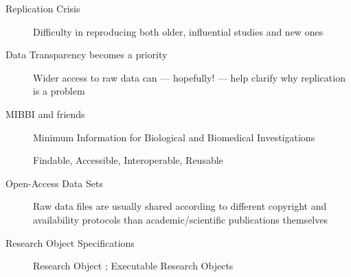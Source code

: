 \begin{frame}{}
\hspace{50pt}\begin{minipage}{.795\textwidth}
{\LARGE {}\selectfont \setlength{\leftmargini}{3pt}\begin{description}
\item[Replication Crisis] {} Difficulty in reproducing both older, influential studies and new ones   
\vspace{8pt}
\item[Data Transparency becomes a priority] {} Wider access to raw data can --- hopefully! --- 
help clarify why replication is a problem
\vspace{8pt}
\item[MIBBI and friends] {} Minimum Information for Biological and Biomedical Investigations  
\vspace{8pt}
\item[] {} Findable, Accessible, Interoperable, Reusable  
\vspace{8pt}
\item[Open-Access Data Sets] {} Raw data files are usually shared according to different 
copyright and availability protocols than academic/scientific publications themselves     
\vspace{8pt}
\item[Research Object Specifications] {} Research Object ; Executable Research Objects 
\end{description}}\end{minipage}


\end{frame}

